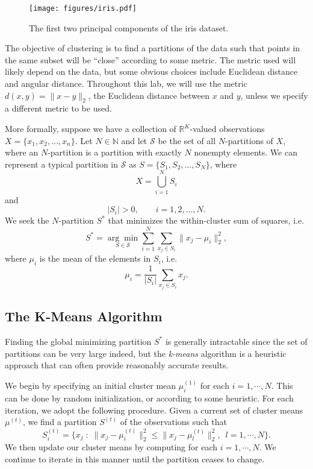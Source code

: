 \begin{figure}
\centering
\texttt{[image: figures/iris.pdf]}
\caption{The first two principal components of the iris dataset.}
\label{fig:iris_data}
\end{figure}

The objective of clustering is to find a partitions of the data such that points in the same subset will be ``close'' according to some metric.
The metric used will likely depend on the data, but some obvious choices include Euclidean distance and angular distance.
Throughout this lab, we will use the metric $d(x,y) = \|x-y\|_2$, the Euclidean distance between $x$ and $y$, unless we specify a different metric to be used.

More formally, suppose we have a collection of $\mathbb{R}^K$-valued observations $X = \{x_1,x_2,\ldots,x_n\}$.
Let $N \in \mathbb{N}$ and let $\mathcal{S}$ be the set of all $N$-partitions of $X$, where an $N$-partition is a partition with exactly $N$ nonempty elements.
We can represent a typical partition in $\mathcal{S}$ as $S = \{S_1,S_2,\ldots,S_N\}$, where
\begin{equation*}
    X = \bigcup_{i=1}^N S_i    
\end{equation*}
and
\begin{equation*}
    |S_i| > 0, \qquad i=1,2,\ldots,N.
\end{equation*}
We seek the $N$-partition $S^*$ that minimizes the within-cluster sum of squares, i.e.
\begin{equation*}
    S^* = \underset{S\in\mathcal{S}}{\arg\min} \sum_{i=1}^N\sum_{x_j\in S_i}\|x_j-\mu_i\|_2^2,
\end{equation*}
where $\mu_i$ is the mean of the elements in $S_i$, i.e.
\begin{equation*}
    \mu_i = \frac{1}{|S_i|}\sum_{x_j\in S_i}x_j.
\end{equation*}

\subsection*{The K-Means Algorithm}

Finding the global minimizing partition $S^*$ is generally intractable since the set of partitions can be very large indeed,
but the \emph{k-means} algorithm is a heuristic approach that can often provide reasonably accurate results.


We begin by specifying an initial cluster mean $\mu_i^{(1)}$ for each $i = 1, \cdots, N$. 
This can be done by random initialization, or according to some heuristic.
For each iteration, we adopt the following procedure.
Given a current set of cluster means $\mu^{(t)}$, we find a partition $S^{(t)}$ of the observations such that
\begin{equation*}
S_{i}^{(t)} = \{x_j \; : \; \|x_j - \mu_{i}^{(t)}\|_2^2 \leq \|x_j - \mu_{l}^{(t)}\|_2^2,\,\,\,  l = 1, \cdots, N\}.
\end{equation*}
We then update our cluster means by computing for each $i = 1, \cdots, N$.
We continue to iterate in this manner until the partition ceases to change.


